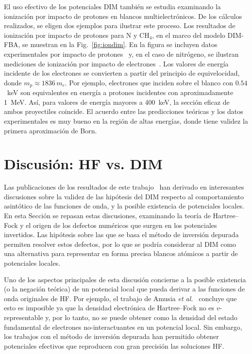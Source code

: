El uso efectivo de los potenciales DIM también se estudia examinando 
la ionización por impacto de protones en blancos multielectrónicos. De 
los cálculos realizados, se eligen dos ejemplos para ilustrar este 
proceso. Los resultados de ionización por impacto de protones para N y 
CH$_4$, en el marco del modelo DIM-FBA, se muestran en la 
Fig.~\ref{fig:iondim}. En la figura se incluyen datos experimentales por 
impacto de protones~\cite{Rudd:83,Rudd:85} y, en el 
caso de nitrógeno, se ilustran mediciones de ionización por impacto de 
electrones~\cite{Brook:78}. Los valores de energía incidente de los 
electrones se convierten a partir del principio de equivelocidad, donde 
$m_p\approx 1836\,m_e$. Por ejemplo, electrones que inciden sobre el 
blanco con $0.54$~keV son equivalentes en energía a protones incidentes 
con aproximadamente 1~MeV. Así, para valores de energía mayores a 
400~keV, la sección eficaz de ambos proyectiles coincide. El acuerdo 
entre las predicciones teóricas y los datos 
experimentales es muy bueno en la región de 
altas energías, donde tiene validez la primera aproximación de Born. 

\section{Discusión: HF vs. DIM}
\label{sec:discusionHF}

Las publicaciones de los resultados de este trabajo~\cite{Mendez:16,
Mendez:19dim,Mendez:18,Mitnik:19} han derivado en interesantes 
discusiones sobre la validez de las hipótesis del DIM respecto al 
comportamiento asintótico de las funciones de onda, y la posible 
existencia de potenciales locales. En esta Sección se repasan estas 
discusiones, examinando la teoría de Hartree--Fock y el origen de los 
defectos numéricos que surgen en los potenciales invertidos. Las 
hipótesis sobre las que se basa el método de inversión depurada permiten 
resolver estos defectos, por lo que se podría considerar al DIM como una 
alternativa para representar en forma precisa blancos atómicos a partir 
de potenciales locales.

Uno de los aspectos principales de esta discusión concierne a la posible 
existencia (o la negación teórica) de un potencial local que pueda 
derivar a las funciones de onda originales de HF. Por ejemplo, el 
trabajo de Amusia \textit{et al.}~\cite{Amusia:04} concluye que esto es 
imposible ya que la densidad electrónica de Hartree--Fock no es 
$v$-representable y, por lo tanto, no se puede obtener como la densidad 
del estado fundamental de electrones no-interactuantes en un potencial 
local. Sin embargo, los trabajos con el método de inversión depurada 
han permitido obtener potenciales efectivos que reproducen con gran 
precisión las soluciones HF.

